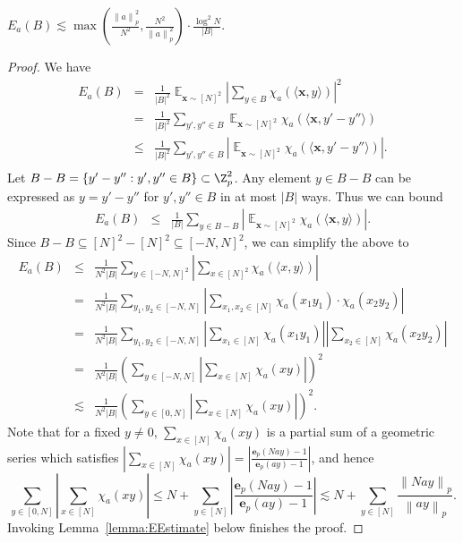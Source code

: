 \documentclass{toc}
\DeclareMathOperator{\Ex}{{\mathbb E}}
\newcommand{\e}{\mathbf{e}}
\newcommand{\x}{\mathbf{x}}
\newcommand{\ip}[1]{\langle #1 \rangle}
\newcommand{\norm}[1]{\left\| #1 \right\|_p}
\begin{document}
 \begin{lemma}
 \label{lemma:prodset}
	 $  E_a(B) \lesssim \max\left(\frac{\norm{a}^2}{N^2},\frac{N^2}{\norm{a}^2}\right) \cdot \frac{ \log^2 N}{|B|}$.
 \end{lemma}
 \begin{proof}
 We have
\begin{eqnarray*}
E_a(B)  &=&  \frac{1}{|B|^2} \Ex_{\x \sim [N]^2}  \left|\sum_{y \in B} \chi_a(\ip{\x,y })\right|^2 \\
&=&   \frac{1}{|B|^2} \sum_{y', y'' \in B}  \Ex_{\x \sim [N]^2} \chi_a(\ip{\x,y'-y'' })  \\
&\le&   \frac{1}{|B|^2}   \sum_{y', y'' \in B}\left| \Ex_{\x \sim [N]^2}  \chi_a(\ip{\x, y'-y''}) \right|. \\
\end{eqnarray*}
Let $B-B=\{y'-y'': y',y'' \in B\} \subset \Z_p^2$. Any element $y \in B-B$ can be expressed as $y=y'-y''$ for $y',y'' \in B$ in at most $|B|$ ways. Thus we can bound
\begin{eqnarray*}
E_a(B)
&\le &   \frac{1}{|B|}  \sum_{y \in B-B} \left| \Ex_{\x \sim [N]^2}  \chi_a(\ip{\x, y}) \right|.
\end{eqnarray*}
Since $B-B \subseteq [N]^2-[N]^2   \subseteq [-N,N]^2$, we can simplify the above  to
%
\begin{eqnarray*}
E_a(B)    &\le&   \frac{1}{N^2 |B|} \sum_{y \in [-N,N]^2}  \left| \sum_{x \in [N]^2}  \chi_a(\ip{x, y}) \right|\\
&=& \frac{1}{N^2|B|} \sum_{y_1,y_2 \in [-N,N]}  \left|\sum_{x_1,x_2 \in [N]}   \chi_a( x_1y_1 )\cdot \chi_a( x_2y_2 ) \right|  \\
	&=&   \frac{1}{N^2|B|} \sum_{y_1,y_2 \in [-N,N]}  \left|  \sum_{x_1 \in [N]}   \chi_a( x_1 y_1 ) \right|\left|  \sum_{x_2 \in [N]}   \chi_a( x_2 y_2 ) \right|    \\
	&=&  \frac{1}{N^2|B|} \left( \sum_{y \in [-N,N]}  \left|\sum_{x \in [N]}  \chi_a(xy) \right| \right)^2 \\
	& \lesssim &  \frac{1}{N^2|B|} \left(\sum_{y \in [0,N]}  \left|\sum_{x \in [N]}  \chi_a(xy) \right| \right)^2.
\end{eqnarray*}
	Note that for a fixed $y\neq 0$, $\sum_{x \in [N]}  \chi_a(xy)$ is a partial sum of a geometric series which satisfies $\left| \sum_{x \in [N]}  \chi_a(xy) \right|= \left| \frac{\e_p(N a y)-1}{\e_p(ay)-1} \right|$, and hence
	$$  \sum_{y \in [0,N]}  \left|\sum_{x \in [N]}  \chi_a(xy) \right| \le N +  \sum_{y \in [N]}  \left| \frac{\e_p(N ay)-1}{\e_p(ay)-1} \right|\lesssim  N+\sum_{y \in [N]} \frac{\norm{Nay}}{\norm{ay}}.  $$
Invoking Lemma~\ref{lemma:EEstimate} below  finishes the proof.
\end{proof}
\end{document}

